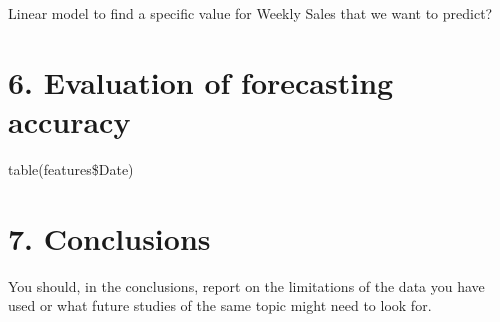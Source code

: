 \documentclass[11pt,]{article}
\begin{document}
Linear model to find a specific value for Weekly Sales that we want to
predict?

\section{6. Evaluation of forecasting
accuracy}\label{evaluation-of-forecasting-accuracy}

table(features\$Date)

\section{7. Conclusions}\label{conclusions}

You should, in the conclusions, report on the limitations of the data
you have used or what future studies of the same topic might need to
look for.

\renewcommand\refname{References}

\end{document}
